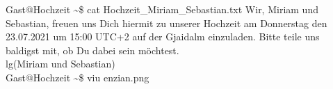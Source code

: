 \documentclass[12pt, a5paper]{article}
\begin{document}
\noindent
{\selectfont
\lbrack Gast@Hochzeit \textasciitilde\rbrack\$ cat Hochzeit\_Miriam\_Sebastian.txt
Wir, Miriam und Sebastian, freuen uns Dich hiermit zu unserer Hochzeit am Donnerstag den 23.07.2021 um 15:00 UTC+2 auf der Gjaidalm einzuladen. Bitte teile uns baldigst mit, ob Du dabei sein möchtest.\\ lg(Miriam und Sebastian) \\
\lbrack Gast@Hochzeit \textasciitilde\rbrack\$ viu enzian.png\\
\vspace*{-40px}
\begin{figure}[H]
\end{figure}
}
\end{document}
